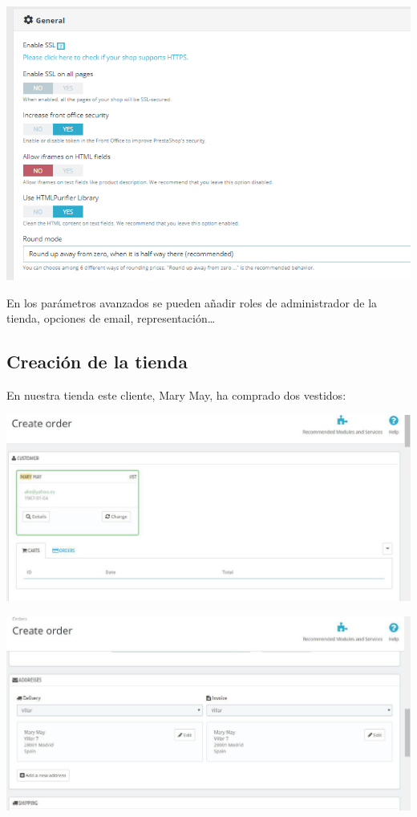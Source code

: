 \documentclass{article}
\begin{document}
\begin{center}
\includegraphics[scale=0.6]{images/conf.png}
\end{center}

En los parámetros avanzados se pueden añadir roles de administrador de la tienda, opciones de email, representación…

\subsection{Creación de la tienda}

En nuestra tienda este cliente, Mary May, ha comprado dos vestidos:

\begin{center}
\includegraphics[scale=0.4]{images/order.jpg}
\end{center}

\begin{center}
\includegraphics[scale=0.4]{images/order2.jpg}
\end{center}
\end{document}

